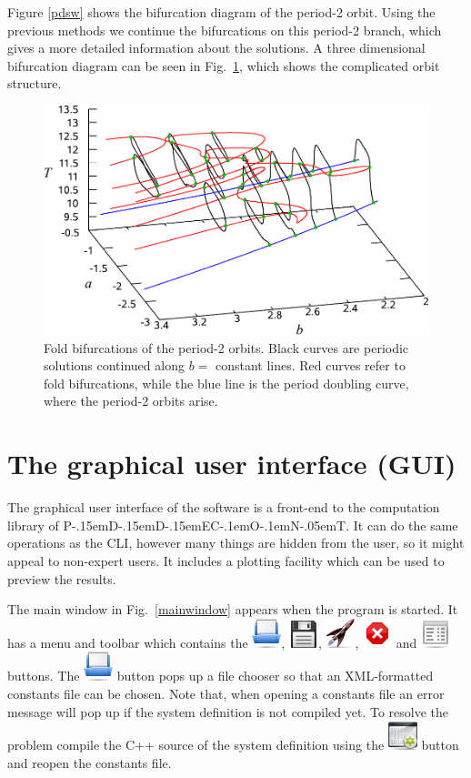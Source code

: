 \documentclass[10pt,a4paper]{ddedoc}
\def\pdde{{P\kern-.15emD\kern-.15emD\kern-.15emE\raisebox{.25ex}{-}C\kern-.1emO\kern-.1emN\kern-.05emT}}
\newcommand{\iconRun}{\protect\includegraphics[height=0.8\baselineskip]{fig/cr32-action-launch}}
\newcommand{\iconStop}{\protect\includegraphics[height=0.8\baselineskip]{fig/cr32-action-stop}}
\newcommand{\iconBuild}{\protect\includegraphics[height=0.8\baselineskip]{fig/cr32-action-build}}
\newcommand{\iconText}{\protect\includegraphics[height=0.8\baselineskip]{fig/cr32-action-view_text}}
\newcommand{\iconOpen}{\protect\includegraphics[height=0.8\baselineskip]{fig/cr32-action-fileopen}}
\newcommand{\iconSave}{\protect\includegraphics[height=0.8\baselineskip]{fig/cr32-action-filesave}}
\begin{document}
Figure \ref{pdsw} shows the bifurcation diagram of the period-2 orbit. Using the
previous methods we continue the bifurcations on this period-2 branch, which
gives a more detailed information about the solutions. A three dimensional
bifurcation diagram can be seen in Fig.\ \ref{pdfold}, which shows the
complicated orbit structure.
\begin{figure}[bth!]
\begin{center}
\includegraphics[scale=0.6]{fig/fold3d-2}
\end{center}
\caption{Fold bifurcations of the period-2 orbits. Black curves are periodic
solutions continued along $b=$ constant lines. Red curves refer to fold
bifurcations, while the blue line is the period doubling curve, where the
period-2 orbits arise. }
\label{pdfold}
\end{figure}

\section{The graphical user interface (GUI)}

The graphical user interface of the software is a front-end to the computation
library of \pdde{}. It can do the same operations as the CLI, however many things are
hidden from the user, so it might appeal to non-expert users. It includes a plotting
facility which can be used to preview the results.

The main window in Fig.\ \ref{mainwindow} appears
when the program  is started.
It has a menu and toolbar which 
contains the  \iconOpen{},  \iconSave{},
 \iconRun{},  \iconStop{} and
 \iconText{} buttons. The  \iconOpen{} button pops up a
file chooser so that an XML-formatted constants file can be chosen. Note that, when opening a constants file an error message will pop up if
the system definition is not compiled yet. To resolve the problem compile the C++ source
of the system definition using the  \iconBuild{} button and reopen the constants file.
\end{document}
